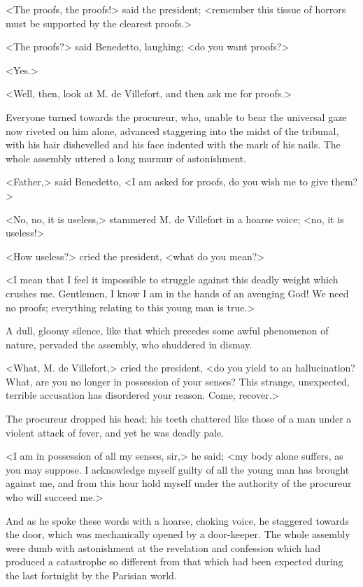  <The proofs, the proofs!> said the president; <remember this tissue of horrors must be supported by the clearest proofs.> 

 <The proofs?> said Benedetto, laughing; <do you want proofs?> 

 <Yes.> 

 <Well, then, look at M. de Villefort, and then ask me for proofs.> 

 Everyone turned towards the procureur, who, unable to bear the universal gaze now riveted on him alone, advanced staggering into the midst of the tribunal, with his hair dishevelled and his face indented with the mark of his nails. The whole assembly uttered a long murmur of astonishment. 

 <Father,> said Benedetto, <I am asked for proofs, do you wish me to give them?> 

 <No, no, it is useless,> stammered M. de Villefort in a hoarse voice; <no, it is useless!> 

 <How useless?> cried the president, <what do you mean?> 

 <I mean that I feel it impossible to struggle against this deadly weight which crushes me. Gentlemen, I know I am in the hands of an avenging God! We need no proofs; everything relating to this young man is true.> 

 A dull, gloomy silence, like that which precedes some awful phenomenon of nature, pervaded the assembly, who shuddered in dismay. 

 <What, M. de Villefort,> cried the president, <do you yield to an hallucination? What, are you no longer in possession of your senses? This strange, unexpected, terrible accusation has disordered your reason. Come, recover.> 

 The procureur dropped his head; his teeth chattered like those of a man under a violent attack of fever, and yet he was deadly pale. 

 <I am in possession of all my senses, sir,> he said; <my body alone suffers, as you may suppose. I acknowledge myself guilty of all the young man has brought against me, and from this hour hold myself under the authority of the procureur who will succeed me.> 

 And as he spoke these words with a hoarse, choking voice, he staggered towards the door, which was mechanically opened by a door-keeper. The whole assembly were dumb with astonishment at the revelation and confession which had produced a catastrophe so different from that which had been expected during the last fortnight by the Parisian world. 

